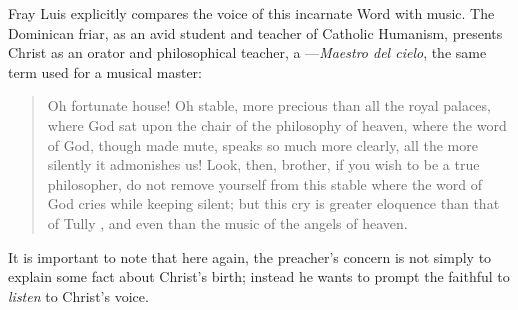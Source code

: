 Fray Luis explicitly compares the voice of this incarnate Word with music.
The Dominican friar, as an avid student and teacher of Catholic Humanism,
presents Christ as an orator and philosophical teacher, a ---\emph{Maestro del cielo}, the same term used for a musical master:
\begin{quote}
    Oh fortunate house!
    Oh stable, more precious than all the royal palaces, where God sat upon the
    chair  of the philosophy of heaven, where the word of God,
    though made mute, speaks so much more clearly, all the more silently it
    admonishes us!
    Look, then, brother, if you wish to be a true philosopher, do not remove
    yourself from this stable where the word of God cries while keeping silent;
    but this cry is greater eloquence than that of Tully , and even
    than the music of the angels of heaven.%
        \Autocite
        [39: .]
        {LuisdeGranada:Xmas}
\end{quote}
It is important to note that here again, the preacher's concern is not simply to
explain some fact about Christ's birth; instead he wants to prompt the faithful
to \emph{listen} to Christ's voice.

